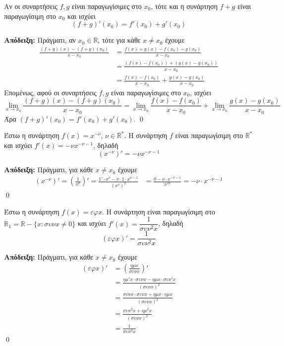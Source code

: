 \documentclass[a4paper, 12pt]{article}
\renewenvironment{proof}[1][\textbf{Απόδειξη}]{%
  \par\noindent\textbf{#1:} \rmfamily}{\qed\par}
\begin{document}
\begin{theorem}{}
  Αν οι συναρτήσεις $f,g$ είναι παραγωγίσιμες στο $x_0$, τότε και η συνάρτηση $f+g$ είναι παραγωγίσιμη στο $x_0$ και ισχύει
  $$(f+g)'(x_0)=f'(x_0)+g'(x_0)$$
\end{theorem}
\begin{proof}
  Πράγματι, αν $x_0\in\mathbb{R}$, τότε για κάθε $x\ne x_0$ έχουμε
  \begin{align*}
    \frac{(f+g)(x)-(f+g)(x_0)}{x-x_0} & =\frac{f(x)+g(x)-f(x_0)-g(x_0)}{x-x_0}               \\
                                      & =\frac{(f(x)-f(x_0))+(g(x)-g(x_0))}{x-x_0}           \\
                                      & =\frac{f(x)-f(x_0)}{x-x_0}+\frac{g(x)-g(x_0)}{x-x_0}
  \end{align*}
  Επομένως, αφού οι συναρτήσεις $f,g$ είναι παραγωγίσιμες στο $x_0$, ισχύει
  $$\lim_{x\to x_0}\frac{(f+g)(x)-(f+g)(x_0)}{x-x_0}=\lim_{x\to x_0}\frac{f(x)-f(x_0)}{x-x_0}+\lim_{x\to x_0}\frac{g(x)-g(x_0)}{x-x_0}$$
  Άρα $(f+g)'(x_0)=f'(x_0)+g'(x_0)$.
\end{proof}

\begin{theorem}{}
  Έστω η συνάρτηση $f(x)=x^{-ν}$, $ν\in\mathbb{R}^*$. Η συνάρτηση $f$ είναι παραγωγίσιμη στο $\mathbb{R}^*$ και ισχύει $f'(x)=-νx^{-ν-1}$, δηλαδή
  $$(x^{-ν})'=-νx^{-ν-1}$$
\end{theorem}
\begin{proof}
  Πράγματι, για κάθε $x\ne x_0$ έχουμε
  \begin{align*}
    (x^{-ν})'=\left( \frac{1}{x^ν} \right)'=\frac{1'\cdot x^{ν}-ν\cdot 1\cdot x^{ν-1}}{(x^ν)^2} & =\frac{0-ν \cdot x^{-ν-1}}{x^{2ν}}=-ν\cdot x^{-ν-1}
  \end{align*}
\end{proof}

\begin{theorem}{}
  Έστω η συνάρτηση $f(x)=εφx$. Η συνάρτηση είναι παραγωγίσιμη στο $\mathbb{R_1}=\mathbb{R}-\{x:συνx\ne 0\}$ και ισχύει $f'(x)=\dfrac{1}{συν^2x}$, δηλαδή
  $$(εφx)'=\frac{1}{συν^2x}$$
\end{theorem}
\begin{proof}
  Πράγματι, για κάθε $x\ne x_0$ έχουμε
  \begin{align*}
    (εφx)' & =\left( \frac{ημx}{συνx}\right)'                \\
           & =\frac{ημ'x\cdot συνx-ημx\cdot συν'x}{(συνx)^2} \\
           & =\frac{συνx\cdot συνx+ημx\cdot ημx}{(συνx)^2}   \\
           & =\frac{συν^2x+ημ^2x}{(συνx)^2}                  \\
           & =\frac{1}{συν^2x}
  \end{align*}
\end{proof}
\end{document}
